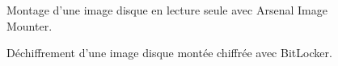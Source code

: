 \begin{figure}
    \centering
    \caption{Montage d'une image disque en lecture seule avec Arsenal Image Mounter.}
    \label{fig:arsenal-image-mounter}
\end{figure}

\begin{figure}
    \centering
    \caption{Déchiffrement d'une image disque montée chiffrée avec BitLocker.}
    \label{fig:bitlocker}
\end{figure}





